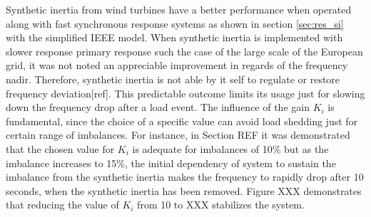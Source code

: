 Synthetic inertia from wind turbines have a better performance when operated along with fast synchronous response systems as shown in section \ref{sec:res_si} with the simplified IEEE model. When synthetic inertia is implemented with slower response primary response such the case of the large scale of the European grid, it was not noted an appreciable improvement in regards of the frequency nadir. Therefore, synthetic inertia is not able by it self to regulate or restore frequency deviation[ref]. This predictable outcome limits its usage just for slowing down the frequency drop after a load event.  The influence of the gain $ K_i $ is fundamental, since the choice of a specific value can avoid load shedding just for certain range of imbalances. For instance, in Section REF it was demonstrated that the chosen value for $ K_i $ is adequate for imbalances of 10\% but as the imbalance increases to 15\%, the initial dependency of system to sustain the imbalance from the synthetic inertia makes the frequency to rapidly drop after 10 seconds, when the synthetic inertia has been removed. Figure XXX demonstrates that reducing the value of $ K_i $ from 10 to XXX stabilizes the system.\\

